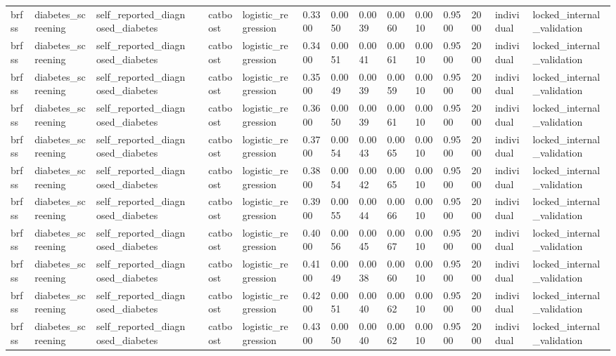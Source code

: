 \begin{tabular}{lllllllllllllll}
brfss & diabetes\_screening & self\_reported\_diagnosed\_diabetes &  & catboost & logistic\_regression & 0.3300 & 0.0050 & 0.0039 & 0.0060 & 0.0010 & 0.9500 & 2000 & individual & locked\_internal\_validation \\
brfss & diabetes\_screening & self\_reported\_diagnosed\_diabetes &  & catboost & logistic\_regression & 0.3400 & 0.0051 & 0.0041 & 0.0061 & 0.0010 & 0.9500 & 2000 & individual & locked\_internal\_validation \\
brfss & diabetes\_screening & self\_reported\_diagnosed\_diabetes &  & catboost & logistic\_regression & 0.3500 & 0.0049 & 0.0039 & 0.0059 & 0.0010 & 0.9500 & 2000 & individual & locked\_internal\_validation \\
brfss & diabetes\_screening & self\_reported\_diagnosed\_diabetes &  & catboost & logistic\_regression & 0.3600 & 0.0050 & 0.0039 & 0.0061 & 0.0010 & 0.9500 & 2000 & individual & locked\_internal\_validation \\
brfss & diabetes\_screening & self\_reported\_diagnosed\_diabetes &  & catboost & logistic\_regression & 0.3700 & 0.0054 & 0.0043 & 0.0065 & 0.0010 & 0.9500 & 2000 & individual & locked\_internal\_validation \\
brfss & diabetes\_screening & self\_reported\_diagnosed\_diabetes &  & catboost & logistic\_regression & 0.3800 & 0.0054 & 0.0042 & 0.0065 & 0.0010 & 0.9500 & 2000 & individual & locked\_internal\_validation \\
brfss & diabetes\_screening & self\_reported\_diagnosed\_diabetes &  & catboost & logistic\_regression & 0.3900 & 0.0055 & 0.0044 & 0.0066 & 0.0010 & 0.9500 & 2000 & individual & locked\_internal\_validation \\
brfss & diabetes\_screening & self\_reported\_diagnosed\_diabetes &  & catboost & logistic\_regression & 0.4000 & 0.0056 & 0.0045 & 0.0067 & 0.0010 & 0.9500 & 2000 & individual & locked\_internal\_validation \\
brfss & diabetes\_screening & self\_reported\_diagnosed\_diabetes &  & catboost & logistic\_regression & 0.4100 & 0.0049 & 0.0038 & 0.0060 & 0.0010 & 0.9500 & 2000 & individual & locked\_internal\_validation \\
brfss & diabetes\_screening & self\_reported\_diagnosed\_diabetes &  & catboost & logistic\_regression & 0.4200 & 0.0051 & 0.0040 & 0.0062 & 0.0010 & 0.9500 & 2000 & individual & locked\_internal\_validation \\
brfss & diabetes\_screening & self\_reported\_diagnosed\_diabetes &  & catboost & logistic\_regression & 0.4300 & 0.0050 & 0.0040 & 0.0062 & 0.0010 & 0.9500 & 2000 & individual & locked\_internal\_validation \\

\end{tabular}

